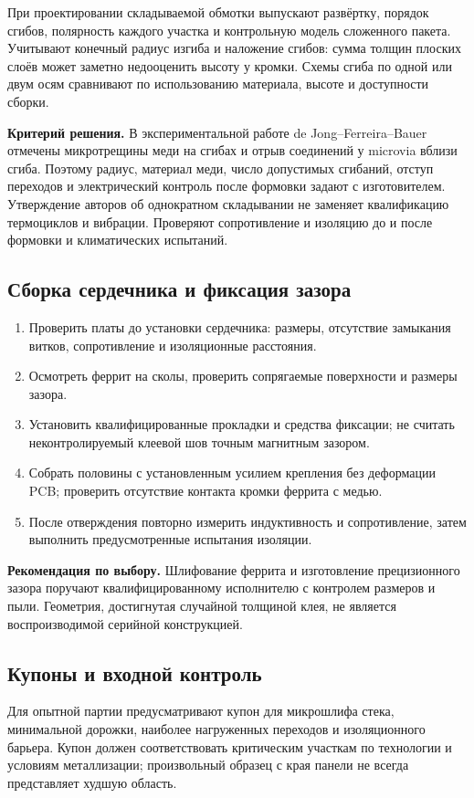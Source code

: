 \documentclass[14pt,a4paper]{extarticle}
\newcommand{\recommend}{\par\noindent\textbf{Рекомендация по выбору.} }
\newcommand{\criterion}{\par\noindent\textbf{Критерий решения.} }
\begin{document}
При проектировании складываемой обмотки выпускают развёртку, порядок сгибов, полярность каждого участка и контрольную модель сложенного пакета. Учитывают конечный радиус изгиба и наложение сгибов: сумма толщин плоских слоёв может заметно недооценить высоту у кромки. Схемы сгиба по одной или двум осям сравнивают по использованию материала, высоте и доступности сборки.

\criterion В экспериментальной работе de Jong--Ferreira--Bauer отмечены микротрещины меди на сгибах и отрыв соединений у microvia вблизи сгиба. Поэтому радиус, материал меди, число допустимых сгибаний, отступ переходов и электрический контроль после формовки задают с изготовителем. Утверждение авторов об однократном складывании не заменяет квалификацию термоциклов и вибрации. Проверяют сопротивление и изоляцию до и после формовки и климатических испытаний.\cite[раздел IV, с.~3162]{doi54}

\subsection{Сборка сердечника и фиксация зазора}
\begin{enumerate}
\item Проверить платы до установки сердечника: размеры, отсутствие замыкания витков, сопротивление и изоляционные расстояния.
\item Осмотреть феррит на сколы, проверить сопрягаемые поверхности и размеры зазора.
\item Установить квалифицированные прокладки и средства фиксации; не считать неконтролируемый клеевой шов точным магнитным зазором.
\item Собрать половины с установленным усилием крепления без деформации PCB; проверить отсутствие контакта кромки феррита с медью.
\item После отверждения повторно измерить индуктивность и сопротивление, затем выполнить предусмотренные испытания изоляции.
\end{enumerate}
\recommend Шлифование феррита и изготовление прецизионного зазора поручают квалифицированному исполнителю с контролем размеров и пыли. Геометрия, достигнутая случайной толщиной клея, не является воспроизводимой серийной конструкцией.

\subsection{Купоны и входной контроль}
Для опытной партии предусматривают купон для микрошлифа стека, минимальной дорожки, наиболее нагруженных переходов и изоляционного барьера. Купон должен соответствовать критическим участкам по технологии и условиям металлизации; произвольный образец с края панели не всегда представляет худшую область.
\end{document}
